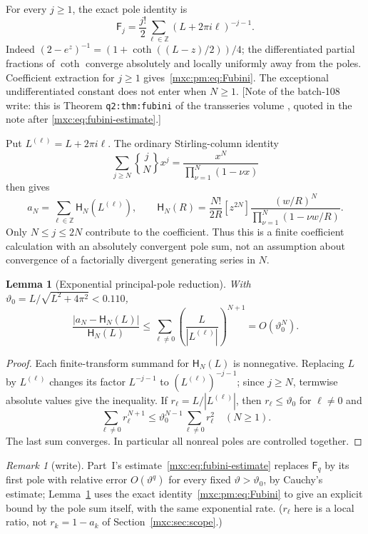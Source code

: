 \documentclass[11pt]{article}
\numberwithin{equation}{section}
\newtheorem{lemma}[theorem]{Lemma}
\theoremstyle{definition}
\theoremstyle{remark}
\newtheorem{remark}[theorem]{Remark}
\newcommand{\StirTwo}[2]{\genfrac{\{} {\}}{0pt}{}{#1}{#2}}
\begin{document}
For every $j\ge1$, the exact pole identity is
\begin{equation}\label{mxc:pm:eq:Fubini}
 \mathsf F_j=\frac{j!}{2}\sum_{\ell\in\mathbb Z}(L+2\pi i\ell)^{-j-1}.
\end{equation}
Indeed $(2-e^z)^{-1}=(1+\coth((L-z)/2))/4$; the differentiated partial
fractions of $\coth$ converge absolutely and locally uniformly away from the
poles. Coefficient extraction for $j\ge1$ gives~\eqref{mxc:pm:eq:Fubini}. The
exceptional undifferentiated constant does not enter when $N\ge1$. [Note of
the batch-108 write: this is Theorem \texttt{q2:thm:fubini} of the
transseries volume \cite{tsvol}, quoted in the note after
\eqref{mxc:eq:fubini-estimate}.]

Put $L^{(\ell)}=L+2\pi i\ell$. The ordinary Stirling-column identity
\[
 \sum_{j\ge N}\StirTwo jN x^j=\frac{x^N}{\prod_{\nu=1}^N(1-\nu x)}
\]
then gives
\begin{equation}\label{mxc:pm:eq:poles}
 a_N=\sum_{\ell\in\mathbb Z}\mathsf H_N(L^{(\ell)}),\qquad
 \mathsf H_N(R)=\frac{N!}{2R}[z^{2N}]
 \frac{(w/R)^N}{\prod_{\nu=1}^N(1-\nu w/R)}.
\end{equation}
Only $N\le j\le2N$ contribute to the coefficient. Thus this is a finite
coefficient calculation with an absolutely convergent pole sum, not an
assumption about convergence of a factorially divergent generating series in
$N$.

\begin{lemma}[Exponential principal-pole reduction]\label{mxc:pm:lem:pole}
With $\vartheta_0=L/\sqrt{L^2+4\pi^2}<0.110$,
\begin{equation}\label{mxc:pm:eq:tailunmarked}
 \frac{|a_N-\mathsf H_N(L)|}{\mathsf H_N(L)}
 \le\sum_{\ell\ne0}\left(\frac{L}{|L^{(\ell)}|}\right)^{N+1}
 =O(\vartheta_0^N).
\end{equation}
\end{lemma}
\begin{proof}
Each finite-transform summand for $\mathsf H_N(L)$ is nonnegative. Replacing
$L$ by $L^{(\ell)}$ changes its factor $L^{-j-1}$ to $(L^{(\ell)})^{-j-1}$;
since $j\ge N$, termwise absolute values give the inequality. If
$r_\ell=L/|L^{(\ell)}|$, then $r_\ell\le\vartheta_0$ for $\ell\ne0$ and
\[
 \sum_{\ell\ne0}r_\ell^{N+1}\le
 \vartheta_0^{N-1}\sum_{\ell\ne0}r_\ell^2\quad(N\ge1).
\]
The last sum converges. In particular all nonreal poles are controlled
together.
\end{proof}

\begin{remark}[write]\label{mxc:pm:rem:pole}
Part~I's estimate~\eqref{mxc:eq:fubini-estimate} replaces $\mathsf F_q$ by its
first pole with relative error $O(\vartheta^q)$ for every fixed
$\vartheta>\vartheta_0$, by Cauchy's estimate; Lemma~\ref{mxc:pm:lem:pole}
uses the exact identity~\eqref{mxc:pm:eq:Fubini} to give an explicit bound by
the pole sum itself, with the same exponential rate. ($r_\ell$ here is a
local ratio, not $r_k=1-a_k$ of Section~\ref{mxc:sec:scope}.)
\end{remark}
\end{document}

